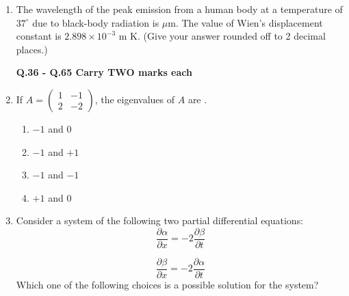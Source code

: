 \documentclass[a4paper,12pt]{exam}
\numberwithin{equation}{enumi}
\numberwithin{figure}{enumi}
\begin{document}
\begin{enumerate}
\item The wavelength of the peak emission from a human body at a temperature of $37^\circ$  due to black-body radiation is \underline{\hspace{1cm}} $\mu$m. The value of Wien’s displacement  constant is $2.898 \times 10^{-3}$ m K. (Give your answer rounded off to 2 decimal places.)

\hfill{}

\textbf{Q.36 - Q.65 Carry TWO marks each}

\vspace{0.25cm}

\item If $A = \begin{pmatrix} 1 & -1 \\ 2 & -2 \end{pmatrix}$, the eigenvalues of $A$ are \underline{\hspace{2cm}}.

\hfill{}

\begin{multicols}{4}
\begin{enumerate}
\item $-1$ and 0
\item $-1$ and $+1$
\item $-1$ and $-1$
\item $+1$ and 0
\end{enumerate}
\end{multicols}

\item Consider a system of the following two partial differential equations: \\

\begin{equation*}
\frac{\partial\alpha}{\partial x} = -2\frac{\partial\beta}{\partial t}  
\end{equation*}

\vspace{8pt}

\begin{equation*}
\frac{\partial\beta}{\partial x} = -2\frac{\partial\alpha}{\partial t}
\end{equation*}
Which one of the following choices is a possible solution for the system? 

\hfill{}


\end{enumerate}
\end{document}
